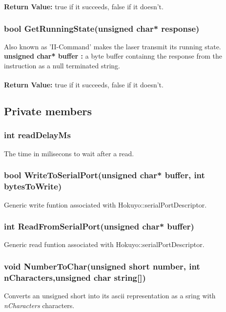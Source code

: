 \documentclass{book}
\begin{document}
\textbf{Return Value: }true if it succeeds, false if it doesn't.\\

\subsubsection{bool GetRunningState(unsigned char* response)} Also known as 'II-Command' makes the laser transmit its running state.\\
\textbf{unsigned char* buffer : } a byte buffer containng the  response from the instruction as a null terminated string.\\\\

\textbf{Return Value: }true if it succeeds, false if it doesn't.\\
	


\subsection{Private members}
\subsubsection{	int readDelayMs}
The time in milisecons to wait after a read.\\
\subsubsection{bool WriteToSerialPort(unsigned char* buffer, int bytesToWrite)} Generic write funtion associated with Hokuyo::serialPortDescriptor.\\
\subsubsection{int ReadFromSerialPort(unsigned char* buffer)}
 Generic read funtion associated with Hokuyo::serialPortDescriptor.\\
 \subsubsection{	void NumberToChar(unsigned short number, int nCharacters,unsigned char string[])}
 Converts an unsigned short into its ascii representation as a sring with \textit{nCharacters} characters.

	


	
\end{document}
